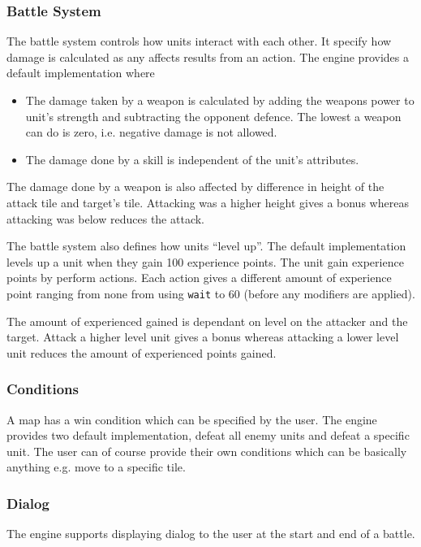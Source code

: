 \subsubsection{Battle System}
\label{ssub:battle_system}

The battle system controls how units interact with each other.  It specify how damage is calculated as any affects results from an action. The engine provides a default implementation where 
\begin{itemize}
	\item The damage taken by a weapon is calculated by adding the weapons power to unit's strength and subtracting the opponent defence. The lowest a weapon can do is zero, i.e. negative damage is not allowed.
	\item The damage done by a skill is independent of the unit's attributes.
\end{itemize}

The damage done by a weapon is also affected by difference in height of the attack tile and target's tile. Attacking was a higher height gives a bonus whereas attacking was below reduces the attack.


The battle system also defines how units ``level up''. The default implementation levels up a unit when they gain 100 experience points. The unit gain experience points by perform actions. Each action gives a different amount of experience point ranging from none from using \texttt{wait} to 60 (before any modifiers are applied).

The amount of experienced gained is dependant on level on the attacker and the target. Attack a higher level unit gives a bonus whereas attacking a lower level unit reduces the amount of experienced points gained.

\subsubsection{Conditions}
\label{ssub:events}

A map has a win condition which can be specified by the user.  The engine provides two default implementation, defeat all enemy units and defeat a specific unit.  The user can of course provide their own conditions which can be basically anything e.g. move to a specific tile. 


\subsubsection{Dialog}
\label{ssub:dialog}
The engine supports displaying dialog to the user at the start and end of a battle. 

